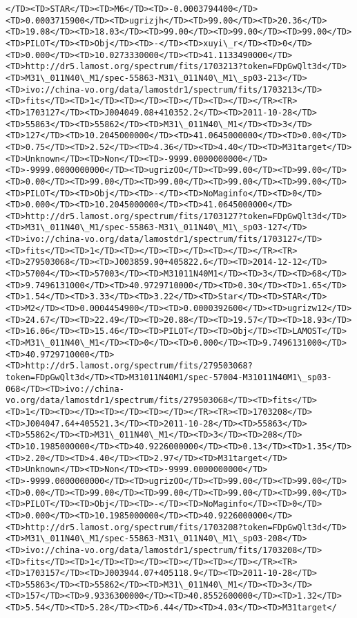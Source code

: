 \documentclass[11pt]{article}
\begin{document}
\begin{Verbatim}[commandchars=\\\{\}]
  </TD><TD>STAR</TD><TD>M6</TD><TD>-0.0003794400</TD><TD>0.0003715900</TD><TD>ugrizjh</TD><TD>99.00</TD><TD>20.36</TD><TD>19.08</TD><TD>18.03</TD><TD>99.00</TD><TD>99.00</TD><TD>99.00</TD><TD>PILOT</TD><TD>Obj</TD><TD>-</TD><TD>xuyi\_r</TD><TD>0</TD><TD>0.000</TD><TD>10.0273330000</TD><TD>41.1133490000</TD><TD>http://dr5.lamost.org/spectrum/fits/1703213?token=FDpGwQlt3d</TD><TD>M31\_011N40\_M1/spec-55863-M31\_011N40\_M1\_sp03-213</TD><TD>ivo://china-vo.org/data/lamostdr1/spectrum/fits/1703213</TD><TD>fits</TD><TD>1</TD><TD></TD><TD></TD><TD></TD></TR><TR><TD>1703127</TD><TD>J004049.08+410352.2</TD><TD>2011-10-28</TD><TD>55863</TD><TD>55862</TD><TD>M31\_011N40\_M1</TD><TD>3</TD><TD>127</TD><TD>10.2045000000</TD><TD>41.0645000000</TD><TD>0.00</TD><TD>0.75</TD><TD>2.52</TD><TD>4.36</TD><TD>4.40</TD><TD>M31target</TD><TD>Unknown</TD><TD>Non</TD><TD>-9999.0000000000</TD><TD>-9999.0000000000</TD><TD>ugrizOO</TD><TD>99.00</TD><TD>99.00</TD><TD>0.00</TD><TD>99.00</TD><TD>99.00</TD><TD>99.00</TD><TD>99.00</TD><TD>PILOT</TD><TD>Obj</TD><TD>-</TD><TD>NoMaginfo</TD><TD>0</TD><TD>0.000</TD><TD>10.2045000000</TD><TD>41.0645000000</TD><TD>http://dr5.lamost.org/spectrum/fits/1703127?token=FDpGwQlt3d</TD><TD>M31\_011N40\_M1/spec-55863-M31\_011N40\_M1\_sp03-127</TD><TD>ivo://china-vo.org/data/lamostdr1/spectrum/fits/1703127</TD><TD>fits</TD><TD>1</TD><TD></TD><TD></TD><TD></TD></TR><TR><TD>279503068</TD><TD>J003859.90+405822.6</TD><TD>2014-12-12</TD><TD>57004</TD><TD>57003</TD><TD>M31011N40M1</TD><TD>3</TD><TD>68</TD><TD>9.7496131000</TD><TD>40.9729710000</TD><TD>0.30</TD><TD>1.65</TD><TD>1.54</TD><TD>3.33</TD><TD>3.22</TD><TD>Star</TD><TD>STAR</TD><TD>M2</TD><TD>0.0004454900</TD><TD>0.0000392600</TD><TD>ugrizw12</TD><TD>24.67</TD><TD>22.49</TD><TD>20.88</TD><TD>19.57</TD><TD>18.93</TD><TD>16.06</TD><TD>15.46</TD><TD>PILOT</TD><TD>Obj</TD><TD>LAMOST</TD><TD>M31\_011N40\_M1</TD><TD>0</TD><TD>0.000</TD><TD>9.7496131000</TD><TD>40.9729710000</TD><TD>http://dr5.lamost.org/spectrum/fits/279503068?token=FDpGwQlt3d</TD><TD>M31011N40M1/spec-57004-M31011N40M1\_sp03-068</TD><TD>ivo://china-vo.org/data/lamostdr1/spectrum/fits/279503068</TD><TD>fits</TD><TD>1</TD><TD></TD><TD></TD><TD></TD></TR><TR><TD>1703208</TD><TD>J004047.64+405521.3</TD><TD>2011-10-28</TD><TD>55863</TD><TD>55862</TD><TD>M31\_011N40\_M1</TD><TD>3</TD><TD>208</TD><TD>10.1985000000</TD><TD>40.9226000000</TD><TD>0.13</TD><TD>1.35</TD><TD>2.20</TD><TD>4.40</TD><TD>2.97</TD><TD>M31target</TD><TD>Unknown</TD><TD>Non</TD><TD>-9999.0000000000</TD><TD>-9999.0000000000</TD><TD>ugrizOO</TD><TD>99.00</TD><TD>99.00</TD><TD>0.00</TD><TD>99.00</TD><TD>99.00</TD><TD>99.00</TD><TD>99.00</TD><TD>PILOT</TD><TD>Obj</TD><TD>-</TD><TD>NoMaginfo</TD><TD>0</TD><TD>0.000</TD><TD>10.1985000000</TD><TD>40.9226000000</TD><TD>http://dr5.lamost.org/spectrum/fits/1703208?token=FDpGwQlt3d</TD><TD>M31\_011N40\_M1/spec-55863-M31\_011N40\_M1\_sp03-208</TD><TD>ivo://china-vo.org/data/lamostdr1/spectrum/fits/1703208</TD><TD>fits</TD><TD>1</TD><TD></TD><TD></TD><TD></TD></TR><TR><TD>1703157</TD><TD>J003944.07+405118.9</TD><TD>2011-10-28</TD><TD>55863</TD><TD>55862</TD><TD>M31\_011N40\_M1</TD><TD>3</TD><TD>157</TD><TD>9.9336300000</TD><TD>40.8552600000</TD><TD>1.32</TD><TD>5.54</TD><TD>5.28</TD><TD>6.44</TD><TD>4.03</TD><TD>M31target</
\end{Verbatim}
\end{document}
